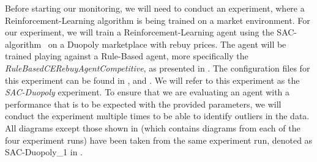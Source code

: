 Before starting our monitoring, we will need to conduct an experiment, where a Reinforcement-Learning algorithm is being trained on a market environment. For our experiment, we will train a Reinforcement-Learning agent using the SAC-algorithm~\cite{StableBaselines3SAC} on a Duopoly marketplace with rebuy prices. The agent will be trained playing against a Rule-Based agent, more specifically the \emph{RuleBasedCERebuyAgentCompetitive}, as presented in . The configuration files for this experiment can be found in ,  and . We will refer to this experiment as the \emph{SAC-Duopoly} experiment. To ensure that we are evaluating an agent with a performance that is to be expected with the provided parameters, we will conduct the experiment multiple times to be able to identify outliers in the data. All diagrams except those shown in  (which contains diagrams from each of the four experiment runs) have been taken from the same experiment run, denoted as SAC-Duopoly\_1 in .




